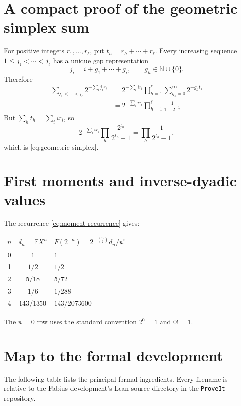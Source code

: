 \documentclass[11pt,oneside]{article}
\theoremstyle{definition}
\theoremstyle{remark}
\newcommand{\N}{\mathbb N}
\newcommand{\E}{\mathbb E}
\begin{document}
\appendix

\section{A compact proof of the geometric simplex sum}

For positive integers $r_1,\ldots,r_\ell$, put
$t_h=r_h+\cdots+r_\ell$.  Every increasing sequence
$1\le j_1<\cdots<j_\ell$ has a unique gap representation
\[
 j_i=i+g_1+\cdots+g_i,
 \qquad g_h\in\N\cup\{0\}.
\]
Therefore
\begin{align*}
 \sum_{j_1<\cdots<j_\ell}2^{-\sum_i j_ir_i}
 &=2^{-\sum_i ir_i}
   \prod_{h=1}^{\ell}
   \sum_{g_h=0}^{\infty}2^{-g_ht_h}\\
 &=2^{-\sum_i ir_i}
   \prod_{h=1}^{\ell}\frac1{1-2^{-t_h}}.
\end{align*}
But $\sum_ht_h=\sum_iir_i$, so
\[
 2^{-\sum_iir_i}\prod_h\frac{2^{t_h}}{2^{t_h}-1}
 =\prod_h\frac1{2^{t_h}-1},
\]
which is \eqref{eq:geometric-simplex}.

\section{First moments and inverse-dyadic values}

The recurrence \eqref{eq:moment-recurrence} gives:
\begin{center}
\renewcommand{\arraystretch}{1.18}
\begin{tabular}{ccl}
\toprule
$n$ & $d_n=\E X^n$ & $F(2^{-n})=2^{-\binom n2}d_n/n!$\\
\midrule
0 & $1$ & $1$\\
1 & $1/2$ & $1/2$\\
2 & $5/18$ & $5/72$\\
3 & $1/6$ & $1/288$\\
4 & $143/1350$ & $143/2073600$\\
\bottomrule
\end{tabular}
\end{center}
The $n=0$ row uses the standard convention $2^0=1$ and $0!=1$.

\section{Map to the formal development}

The following table lists the principal formal ingredients.  Every filename is
relative to the Fabius development's Lean source directory in the
\texttt{ProveIt} repository.
\end{document}

